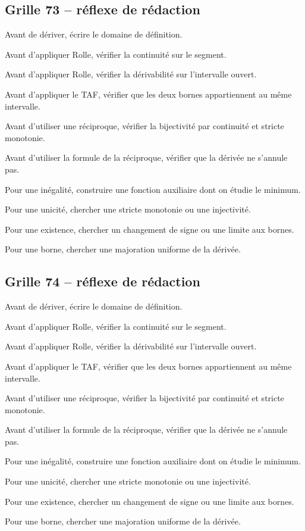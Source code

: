 \documentclass[11pt,a4paper]{article}
\begin{document}
\subsection*{Grille 73 -- réflexe de rédaction}

\begin{methodebox}

Avant de dériver, écrire le domaine de définition.

Avant d'appliquer Rolle, vérifier la continuité sur le segment.

Avant d'appliquer Rolle, vérifier la dérivabilité sur l'intervalle ouvert.

Avant d'appliquer le TAF, vérifier que les deux bornes appartiennent au même intervalle.

Avant d'utiliser une réciproque, vérifier la bijectivité par continuité et stricte monotonie.

Avant d'utiliser la formule de la réciproque, vérifier que la dérivée ne s'annule pas.

Pour une inégalité, construire une fonction auxiliaire dont on étudie le minimum.

Pour une unicité, chercher une stricte monotonie ou une injectivité.

Pour une existence, chercher un changement de signe ou une limite aux bornes.

Pour une borne, chercher une majoration uniforme de la dérivée.

\end{methodebox}

\subsection*{Grille 74 -- réflexe de rédaction}

\begin{methodebox}

Avant de dériver, écrire le domaine de définition.

Avant d'appliquer Rolle, vérifier la continuité sur le segment.

Avant d'appliquer Rolle, vérifier la dérivabilité sur l'intervalle ouvert.

Avant d'appliquer le TAF, vérifier que les deux bornes appartiennent au même intervalle.

Avant d'utiliser une réciproque, vérifier la bijectivité par continuité et stricte monotonie.

Avant d'utiliser la formule de la réciproque, vérifier que la dérivée ne s'annule pas.

Pour une inégalité, construire une fonction auxiliaire dont on étudie le minimum.

Pour une unicité, chercher une stricte monotonie ou une injectivité.

Pour une existence, chercher un changement de signe ou une limite aux bornes.

Pour une borne, chercher une majoration uniforme de la dérivée.

\end{methodebox}
\end{document}
